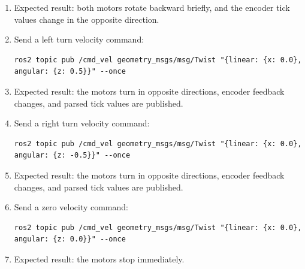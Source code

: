 \documentclass[12pt]{article}
\begin{document}
\begin{enumerate}
\begin{verbatim}
    \end{verbatim}
    \item Expected result: both motors rotate backward briefly, and the encoder tick values change in the opposite direction.
    \item Send a left turn velocity command:
    \begin{verbatim}
ros2 topic pub /cmd_vel geometry_msgs/msg/Twist "{linear: {x: 0.0}, angular: {z: 0.5}}" --once
    \end{verbatim}
    \item Expected result: the motors turn in opposite directions, encoder feedback changes, and parsed tick values are published.
    \item Send a right turn velocity command:
    \begin{verbatim}
ros2 topic pub /cmd_vel geometry_msgs/msg/Twist "{linear: {x: 0.0}, angular: {z: -0.5}}" --once
    \end{verbatim}
    \item Expected result: the motors turn in opposite directions, encoder feedback changes, and parsed tick values are published.
    \item Send a zero velocity command:
    \begin{verbatim}
ros2 topic pub /cmd_vel geometry_msgs/msg/Twist "{linear: {x: 0.0}, angular: {z: 0.0}}" --once
    \end{verbatim}
    \item Expected result: the motors stop immediately.
\end{enumerate}
\end{document}
